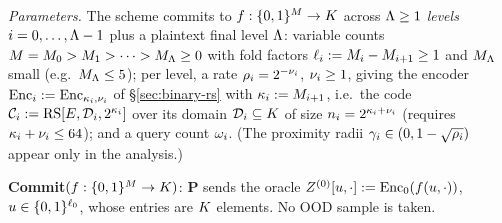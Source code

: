 \begin{protocol}\label{fig:protocol}
\ \par\smallskip
\emph{Parameters.} The scheme commits to $f : \{0,1\}^{M} \to K$ across $\Lambda \ge 1$ \emph{levels} $i = 0, \dots, \Lambda-1$ plus a plaintext final level $\Lambda$: variable counts $M = M_0 > M_1 > \dots > M_\Lambda \ge 0$ with fold factors $\ell_i := M_i - M_{i+1} \ge 1$ and $M_\Lambda$ small (e.g.\ $M_\Lambda \le 5$); per level, a rate $\rho_i = 2^{-\nu_i}$, $\nu_i \ge 1$, giving the encoder $\mathrm{Enc}_i := \mathrm{Enc}_{\kappa_i, \nu_i}$ of \S\ref{sec:binary-rs} with $\kappa_i := M_{i+1}$, i.e.\ the code $\mathcal{C}_i := \mathrm{RS}[E, \mathcal{D}_i, 2^{\kappa_i}]$ over its domain $\mathcal{D}_i \subseteq K$ of size $n_i = 2^{\kappa_i + \nu_i}$ (requires $\kappa_i + \nu_i \le 64$); and a query count $\omega_i$. (The proximity radii $\gamma_i \in (0, 1 - \sqrt{\rho_i})$ appear only in the analysis.)

\smallskip
\textbf{Commit}$(f : \{0,1\}^{M} \to K)$: $\mathbf{P}$ sends the oracle $Z^{(0)}[u, \cdot] := \mathrm{Enc}_0(f(u, \cdot))$, $u \in \{0,1\}^{\ell_0}$, whose entries are $K$ elements. No OOD sample is taken.


\end{protocol}
